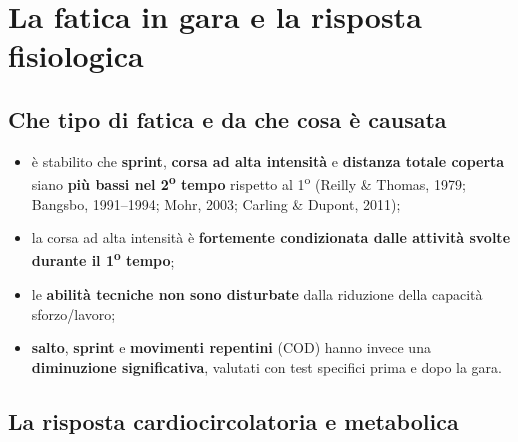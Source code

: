 \section{La fatica in gara e la risposta fisiologica}

\subsection{Che tipo di fatica e da che cosa è causata}

\begin{itemize}
  \item è stabilito che \textbf{sprint}, \textbf{corsa ad alta intensità} e \textbf{distanza totale
    coperta} siano \textbf{più bassi nel 2\textsuperscript{o} tempo} rispetto al
    1\textsuperscript{o} (Reilly \& Thomas, 1979; Bangsbo, 1991--1994; Mohr, 2003; Carling \&
    Dupont, 2011);
  \item la corsa ad alta intensità è \textbf{fortemente condizionata dalle attività svolte durante
    il 1\textsuperscript{o} tempo};
  \item le \textbf{abilità tecniche non sono disturbate} dalla riduzione della capacità
    sforzo/lavoro;
  \item \textbf{salto}, \textbf{sprint} e \textbf{movimenti repentini} (COD) hanno invece una
    \textbf{diminuzione significativa}, valutati con test specifici prima e dopo la gara.
\end{itemize}

\subsection{La risposta cardiocircolatoria e metabolica}

